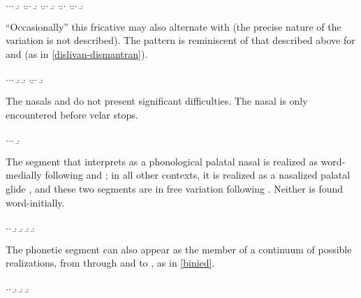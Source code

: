 \ex.\label{ex:bothoa-h-exx}\a.\a.
\b.
\z.\b.\a.
\b.
\z.\b.\a.
\b.
\z.\b.\a.
\z.\b.\a.
\b.

\enquote{Occasionally} this fricative may also alternate with \ipa{[s]} (the precise nature of the variation is not described). The pattern is reminiscent
of that described above for \ipa{[s]} and \ipa{[z]} (as in \cref{dislivan-dismantran}).

\ex.\a.\a.
\b.
\b.
\z.\b.\a.
\b.

The nasals \ipa{[m]} and \ipa{[n]} do not present significant difficulties. The nasal \ipa{[ŋ]} is only encountered before velar stops.

\ex.\a.\a.
\b.

The segment that \citet{humphreys95:_phonol_bothoa_saint_nicol_pelem} interprets as a phonological palatal nasal \ipa{[ɲ]} is realized as  word-medially following  and ; in all other contexts, it is realized as a nasalized palatal glide , and these two segments are in free variation following \ipa{[w]}. Neither is found word-initially.

\ex.\a.
\b.
\b.
\b.
\b.


The phonetic segment  can also appear as the member of a continuum of possible realizations, from \ipa{[ni]} through \ipa{[nj]} and \ipa{[nʲ]} to \ipa{[ɲ]}, as in \cref{binied}.

\ex.\label{binied}\a.
\b.
\b.
\b.


